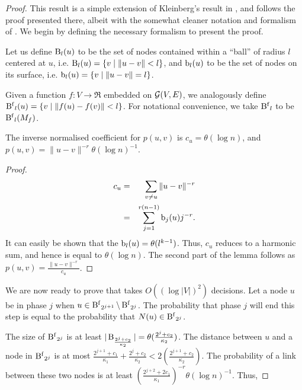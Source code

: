 \begin{proof}

This result is a simple extension of Kleinberg's result in
\cite{Kleinberg2000}, and follows the proof presented there, albeit with
the somewhat cleaner notation and formalism of \cite{Martel2004}. We
begin by defining the necessary formalism to present the proof.

\begin{definition}
Let us define $\operatorname{B}_l(u)$ to be the set of nodes contained within
a ``ball'' of radius $l$ centered at $u$, i.e.  $\operatorname{B}_l(u) = \{ v \mid
\|u - v\| < l \}$, and $\operatorname{b}_l(u)$ to be the set of nodes on its
surface, i.e. $\operatorname{b}_l(u) = \{ v \mid \|u - v\| = l \}$.

Given a function $f:V \to \Re$ embedded on $\mathcal{G}(V,E)$, we analogously
define $\operatorname{B^{f}}_l(u) = \{ v \mid \|f(u) - f(v)\| < l \}$. For notational
convenience, we take $\operatorname{B^{f}}_l$ to be $\operatorname{B^{f}}_l(M_f)$.
\end{definition}

\begin{lemma}
    The inverse normalised coefficient for $p(u,v)$ is $c_u = \theta(
    \log n )$, and $p(u,v) = \|u - v\|^{-r} \theta(\log n)^{-1}$.
\end{lemma}
\begin{proof}
    \begin{eqnarray*}
        c_u &=& \sum_{v \ne u} \|u - v\|^{-r} \\
            &=& \sum_{j=1}^{r(n-1)} \operatorname{b}_j(u) j^{-r}.
    \end{eqnarray*}
    It can easily be shown that the $\operatorname{b}_l(u) = \theta( l^{k-1} )$.
    Thus, $c_u$ reduces to a harmonic sum, and hence is equal to
    $\theta( \log n )$. The second part of the lemma follows as $p(u,v)
    = \frac{ \|u - v\|^{-r} }{c_u}$. 
\end{proof}

We are now ready to prove that \egreedyalgo takes $O( (\log |V|)^2 )$
decisions. Let a node $u$ be in phase $j$ when $u \in \operatorname{B^{f}}_{2^{j+1}}
\setminus \operatorname{B^{f}}_{2^{j}}$. The probability that phase $j$ will end this
step is equal to the probability that $N(u) \in \operatorname{B^{f}}_{2^{j}}$. 

The size of $\operatorname{B^{f}}_{2^{j}}$ is at least $|\operatorname{B}_{\frac{
2^{j}+c_2}{\kappa_2}}| = \theta(\frac{2^{j}+c_2}{\kappa_2})$. The
distance between $u$ and a node in $\operatorname{B^{f}}_{2^{j}}$ is at most
$\frac{2^{j+1} + c_1}{ \kappa_1 } + \frac{2^{j} + c_2}{\kappa_2}
< 2(\frac{2^{j+1} + c_2}{\kappa_2})$. The probability of a link between
these two nodes is at least $(\frac{2^{j+2} + 2 c_1}{\kappa_1})^{-r}
\theta(\log n)^{-1} $. Thus, 


\end{proof}
